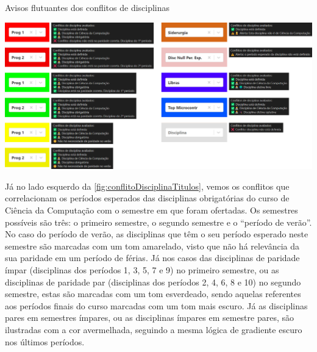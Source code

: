 \begin{MyCenteredFigure} \caption{Avisos flutuantes dos conflitos de disciplinas} \label{fig:conflitoDisciplinaTitulos}
  \includegraphics[width=\textwidth]{files/img/2.02!5-desenvolvimento/2.02!5.1.5-conflitos/Categorias Disciplinas}
\end{MyCenteredFigure}

Já no lado esquerdo da \autoref{fig:conflitoDisciplinaTitulos}, vemos os conflitos que correlacionam os períodos esperados das disciplinas obrigatórias do curso de Ciência da Computação com o semestre em que foram ofertadas. Os semestres possíveis são três: o primeiro semestre, o segundo semestre e o ``período de verão''. No caso do período de verão, as disciplinas que têm o seu período esperado neste semestre são marcadas com um tom amarelado, visto que não há relevância da sua paridade em um período de férias. Já nos casos das disciplinas de paridade ímpar (disciplinas dos períodos 1, 3, 5, 7 e 9) no primeiro semestre, ou as disciplinas de paridade par (disciplinas dos períodos 2, 4, 6, 8 e 10) no segundo semestre, estas são marcadas com um tom esverdeado, sendo aquelas referentes aos períodos finais do curso marcadas com um tom mais escuro. Já as disciplinas pares em semestres ímpares, ou as disciplinas ímpares em semestre pares, são ilustradas com a cor avermelhada, seguindo a mesma lógica de gradiente escuro nos últimos períodos.
